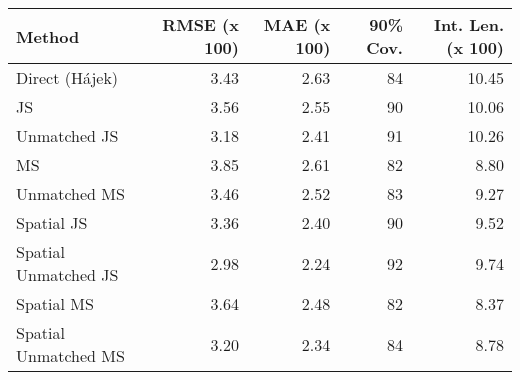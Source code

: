 
\begin{tabular}{lrrrr}
\toprule
Method & RMSE (x 100) & MAE (x 100) & 90\% Cov. & Int. Len. (x 100)\\
\midrule
Direct (Hájek) & 3.43 & 2.63 & 84 & 10.45\\
JS & 3.56 & 2.55 & 90 & 10.06\\
Unmatched JS & 3.18 & 2.41 & 91 & 10.26\\
MS & 3.85 & 2.61 & 82 & 8.80\\
Unmatched MS & 3.46 & 2.52 & 83 & 9.27\\
Spatial JS & 3.36 & 2.40 & 90 & 9.52\\
Spatial Unmatched JS & 2.98 & 2.24 & 92 & 9.74\\
Spatial MS & 3.64 & 2.48 & 82 & 8.37\\
Spatial Unmatched MS & 3.20 & 2.34 & 84 & 8.78\\
\bottomrule
\end{tabular}
